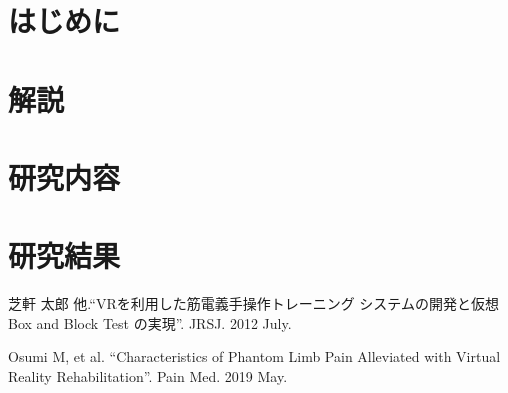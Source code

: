 \documentclass{ltjsarticle}
\begin{document}
\section{はじめに}
\section{解説}
\section{研究内容}
\section{研究結果}

\begin{thebibliography}{99}%
	\begin{spacing}{0.8}

		芝軒 太郎 他.``VRを利用した筋電義手操作トレーニング
		システムの開発と仮想 Box and Block Test の実現''.
		JRSJ. 2012 July.

		Osumi M, et al.
		``Characteristics of Phantom Limb Pain Alleviated
		with Virtual Reality Rehabilitation''.
		Pain Med. 2019 May.

	\end{spacing}
\end{thebibliography}
\end{document}
